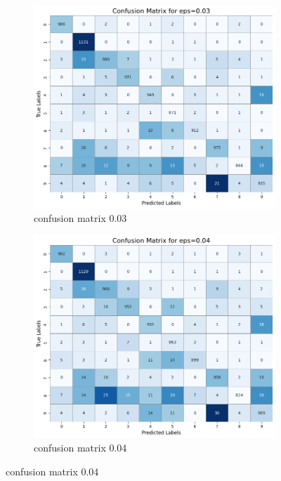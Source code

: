 \documentclass[11pt,onside]{article}
\begin{document}
\begin{figure}[h]
  \centering
  \begin{subfigure}[b]{0.49\textwidth}
    \centering
    \includegraphics[width=\textwidth]{V2_images/target_confusion_matrix_eps_0.03_attack_1.png}
    \caption{confusion matrix 0.03}
    \label{fig:image1}
  \end{subfigure}
  \hfill
  \begin{subfigure}[b]{0.49\textwidth}
    \centering
    \includegraphics[width=\textwidth]{V2_images/target_confusion_matrix_eps_0.04_attack_1.png}
    \caption{confusion matrix 0.04}
    \label{fig:image2}
  \end{subfigure}
 
  \label{fig:images}
\end{figure}
\end{document}
